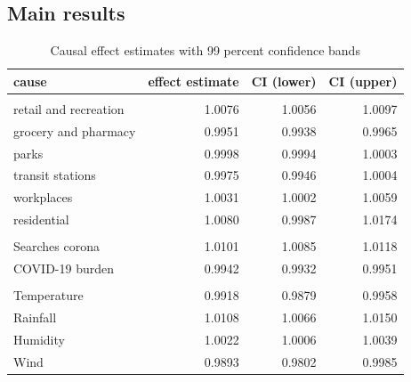 \documentclass[]{elsarticle} %
\begin{document}
\hypertarget{main-results}{%
\subsection{Main results}\label{main-results}}

\begin{table}

\caption{\label{tab:causaleffects}Causal effect estimates with 99 percent confidence bands}
\centering
\begin{tabular}[t]{lrrr}
\toprule
cause & effect estimate & CI (lower) & CI (upper)\\
\midrule
\addlinespace[0.3em]
\multicolumn{4}{l}{\textbf{Mobility}}\\
\hspace{1em}retail and recreation & 1.0076 & 1.0056 & 1.0097\\
\hspace{1em}grocery and pharmacy & 0.9951 & 0.9938 & 0.9965\\
\hspace{1em}parks & 0.9998 & 0.9994 & 1.0003\\
\hspace{1em}transit stations & 0.9975 & 0.9946 & 1.0004\\
\hspace{1em}workplaces & 1.0031 & 1.0002 & 1.0059\\
\hspace{1em}residential & 1.0080 & 0.9987 & 1.0174\\
\addlinespace[0.3em]
\multicolumn{4}{l}{\textbf{Awareness}}\\
\hspace{1em}Searches corona & 1.0101 & 1.0085 & 1.0118\\
\hspace{1em}COVID-19 burden & 0.9942 & 0.9932 & 0.9951\\
\addlinespace[0.3em]
\multicolumn{4}{l}{\textbf{Weather}}\\
\hspace{1em}Temperature & 0.9918 & 0.9879 & 0.9958\\
\hspace{1em}Rainfall & 1.0108 & 1.0066 & 1.0150\\
\hspace{1em}Humidity & 1.0022 & 1.0006 & 1.0039\\
\hspace{1em}Wind & 0.9893 & 0.9802 & 0.9985\\
\bottomrule
\end{tabular}
\end{table}
\end{document}
